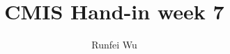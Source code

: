 \documentclass[acmtog]{acmart}
\begin{document}
\title{CMIS Hand-in week 7}

\author{Runfei Wu}


\maketitle
\end{document}
